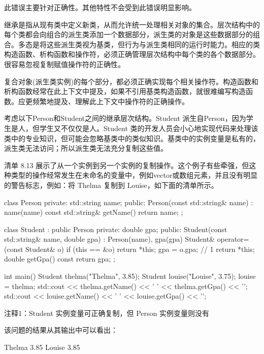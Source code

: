此错误主要针对正确性。其他特性不会受到此错误明显影响。

继承是指从现有类中定义新类，从而允许统一处理相关对象的集合。层次结构中的每个类都会向组合的派生类添加一个数据部分，派生类的对象是这些数据部分的组合。多态是将这些派生类视为基类，但行为与派生类相同的运行时能力。相应的类构造函数、析构函数和操作符，必须正确管理层次结构中每个类的各个数据部分。很容易忽视复制赋值操作符的正确性。


复合对象(派生类实例)的每个部分，都必须正确实现每个相关操作符。构造函数和析构函数经常在此上下文中提及，如果不引用基类构造函数，就很难编写构造函数。应更频繁地提及、理解此上下文中操作符的正确操作。

考虑以下Person和Student之间的继承层次结构。Student 派生自Person，因为学生是人，但学生又不仅仅是人。Student 类的开发人员会小心地实现代码来处理该类中的专业知识，但可能会忽略基类中的类似知识。基类中的实例变量是私有的，派生类无法访问；所以派生类无法充分复制这些值。

清单 8.13 展示了从一个实例到另一个实例的复制操作。这个例子有些牵强，但这种类型的操作经常发生在未命名的变量中，例如vector或数组元素，并且没有明显的警告标志，例如：将 Thelma 复制到 Louise，如下面的清单所示。


\begin{cpp}
class Person {
private:
  std::string name;
public:
  Person(const std::string& name) : name(name) {}
  const std::string& getName() { return name; }
};

class Student : public Person {
private:
  double gpa;
public:
  Student(const std::string& name, double gpa) : Person(name), gpa(gpa) {}
  Student& operator=(const Student& o) {
    if (this == &o)
      return *this;
    gpa = o.gpa; // 1
    return *this;
  }
double getGpa() const { return gpa; }
};

int main() {
  Student thelma("Thelma", 3.85);
  Student louise("Louise", 3.75);
  louise = thelma;
  std::cout << thelma.getName() << ' ' << thelma.getGpa() << '\n';
  std::cout << louise.getName() << ' ' << louise.getGpa() << '\n';
}
\end{cpp}

{\footnotesize
注释1：Student 实例变量可正确复制，但 Person 实例变量则没有
}

该问题的结果从其输出中可以看出：

\begin{shell}
Thelma 3.85
Louise 3.85
\end{shell}

